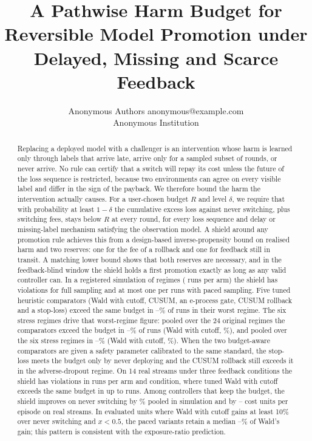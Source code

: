 \documentclass[10pt]{article}
\title{A Pathwise Harm Budget for Reversible Model Promotion under Delayed, Missing and Scarce Feedback}
\author{\name Anonymous Authors \email anonymous@example.com \\
      \addr Anonymous Institution}
\theoremstyle{plain}
\theoremstyle{definition}
\begin{document}
\maketitle

\begin{abstract}
Replacing a deployed model with a challenger is an intervention whose harm is learned only through labels that arrive late, arrive only for a sampled subset of rounds, or never arrive.
No rule can certify that a switch will repay its cost unless the future of the loss sequence is restricted, because two environments can agree on every visible label and differ in the sign of the payback.
We therefore bound the harm the intervention actually causes.
For a user-chosen budget $R$ and level $\delta$, we require that with probability at least $1-\delta$ the cumulative excess loss against never switching, plus switching fees, stays below $R$ at every round, for every loss sequence and delay or missing-label mechanism satisfying the observation model.
A shield around any promotion rule achieves this from a design-based inverse-propensity bound on realised harm and two reserves: one for the fee of a rollback and one for feedback still in transit.
A matching lower bound shows that both reserves are necessary, and in the feedback-blind window the shield holds a first promotion exactly as long as any valid controller can.
In a registered simulation of \NRegimes{} regimes (\NRunsPerArm{} runs per arm) the shield has \COneTotal{} violations for full sampling and at most one per \NRunsPerArm{} runs with paced sampling.
Five tuned heuristic comparators (Wald with cutoff, CUSUM, an e-process gate, CUSUM rollback and a stop-loss) exceed the same budget in \CThreeMinWorst--\CThreeMaxWorst\% of runs in their worst regime.
The six stress regimes drive that worst-regime figure: pooled over the 24 original regimes the comparators exceed the budget in \OrigExceedMin--\OrigExceedMax\% of runs (Wald with cutoff, \OrigExceedWald\%), and pooled over the six stress regimes in \StressExceedMin--\StressExceedMax\% (Wald with cutoff, \StressExceedWald\%).
When the two budget-aware comparators are given a safety parameter calibrated to the same standard, the stop-loss meets the budget only by never deploying and the CUSUM rollback still exceeds it in the adverse-dropout regime.
On 14 real streams under three feedback conditions the shield has \RealShieldViolClean{} violations in \RealRunsPerArm{} runs per arm and condition, where tuned Wald with cutoff exceeds the same budget in up to \RealMaxExceed{} runs.
Among controllers that keep the budget, the shield improves on never switching by \SimVsNeverPct\% pooled in simulation and by \RealVsNeverMin--\RealVsNeverMax{} cost units per episode on real streams. In evaluated units where Wald with cutoff gains at least 10\% over never switching and $x<0.5$, the paced variants retain a median \KeepLo--\KeepHi\% of Wald's gain; this pattern is consistent with the exposure-ratio prediction.
\end{abstract}
\end{document}

